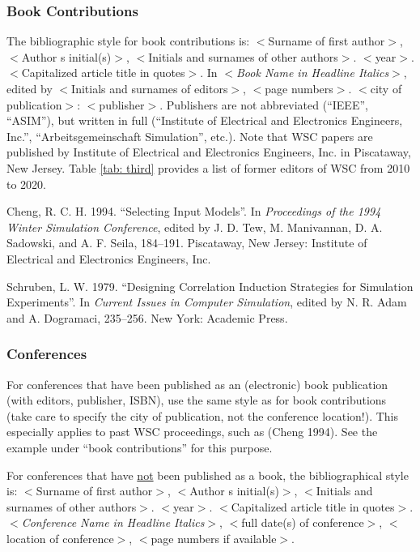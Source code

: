 \documentclass{article}
\begin{document}
\subsubsection{Book Contributions}
The bibliographic style for book contributions is: 
$<$Surname of first author$>$, $<$Author s initial(s)$>$, $<$Initials and surnames of other authors$>$. $<$year$>$. 
$<$Capitalized article title in quotes$>$. In $<${\em Book Name in Headline Italics}$>$, 
edited by $<$Initials and surnames of editors$>$, $<$page numbers$>$. $<$city of publication$>$: $<$publisher$>$.
Publishers are not abbreviated (``IEEE'', ``ASIM''), but written in full (``Institute of Electrical and Electronics Engineers, Inc.'', ``Arbeitsgemeinschaft Simulation'', etc.). Note that WSC papers are published by Institute of Electrical and Electronics Engineers, Inc. in Piscataway, New Jersey. Table \ref{tab: third} provides a list of former editors of WSC from 2010 to 2020. 

{\footnotesize
\begin{hangref}
\item Cheng, R. C. H. 1994. ``Selecting Input Models''. In \textit{Proceedings of the 1994 Winter Simulation Conference}, edited by J. D. Tew, M. Manivannan, D. A. Sadowski, and A. F. Seila, 184--191. Piscataway, New Jersey: Institute of Electrical and Electronics Engineers, Inc. 
\item Schruben, L. W. 1979. ``Designing Correlation Induction Strategies for Simulation Experiments''. In \textit{Current Issues in Computer Simulation}, edited by N. R. Adam and A. Dogramaci, 235--256. New York: Academic Press.
\end{hangref}
}

\subsubsection{Conferences}
For conferences that have been published as an (electronic) book publication (with editors, publisher, ISBN),
use the same style as for book contributions (take care to specify the city of publication, not the conference location!). 
This especially applies to past WSC proceedings, such as (Cheng 1994). See the example under ``book contributions'' for this purpose.

For conferences that have \underline{not} been published as a book, the bibliographical style is: 
$<$Surname of first author$>$, $<$Author s initial(s)$>$, $<$Initials and surnames of other authors$>$. $<$year$>$. 
$<$Capitalized article title in quotes$>$. $<${\em Conference Name in Headline Italics}$>$, $<$full date(s) of conference$>$, 
$<$location of conference$>$, $<$page numbers if available$>$.
\end{document}

